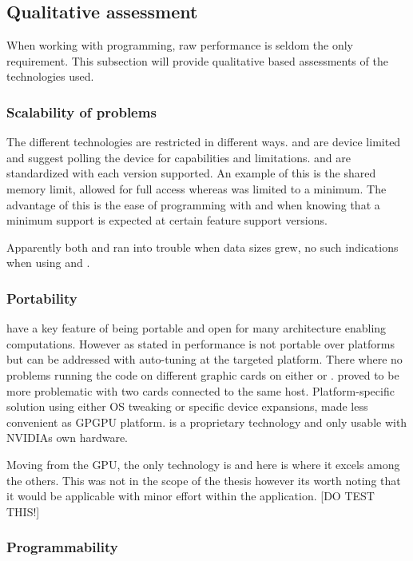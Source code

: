 \subsection{Qualitative assessment}

When working with programming, raw performance is seldom the only requirement. This subsection will provide qualitative based assessments of the technologies used.

\subsubsection{Scalability of problems}

The different technologies are restricted in different ways. {\CU} and {\OCL} are device limited and suggest polling the device for capabilities and limitations. {\DX} and {\GL} are standardized with each version supported. An example of this is the shared memory limit, {\CU} allowed for full access whereas {\DX} was limited to a minimum. The advantage of this is the ease of programming with {\DX} and {\GL} when knowing that a minimum support is expected at certain feature support versions.

Apparently both {\DX} and {\GL} ran into trouble when data sizes grew, no such indications when using {\CU} and {\OCL}.

\subsubsection{Portability}

{\OCL} have a key feature of being portable and open for many architecture enabling computations. However as stated in \cite{fang2011comprehensive, du2012cuda} performance is not portable over platforms but can be addressed with auto-tuning at the targeted platform. There where no problems running the code on different graphic cards on either {\OCL} or {\DX}. {\GL} proved to be more problematic with two cards connected to the same host. Platform-specific solution using either OS tweaking or specific device {\GL} expansions, made {\GL} less convenient as GPGPU platform. {\CU} is a proprietary technology and only usable with NVIDIAs own hardware.

Moving from the GPU, the only technology is {\OCL} and here is where it excels among the others. This was not in the scope of the thesis however its worth noting that it would be applicable with minor effort within the application. [DO TEST THIS!]

\subsubsection{Programmability}

